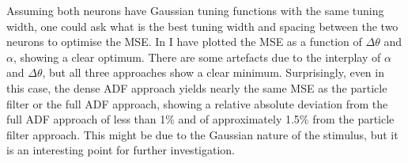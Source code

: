 %
%

Assuming both neurons have Gaussian tuning functions with the same tuning width, one could ask
what is the best tuning width and spacing between the two neurons to optimise the MSE. In  I have plotted the MSE as a function of $\Delta\theta$ and
$\alpha$, showing a clear optimum. There are some artefacts due to the interplay of $\alpha$ and $\Delta\theta$, but all three approaches show a clear minimum. Surprisingly, even
in this case, the dense ADF approach yields nearly the same MSE as the particle filter or the full ADF approach, showing a relative absolute deviation from the full ADF approach of
less than 1\% and of approximately 1.5\% from the particle filter approach. This might be due to the Gaussian nature of the stimulus, but
it is an interesting point for further investigation.\par

